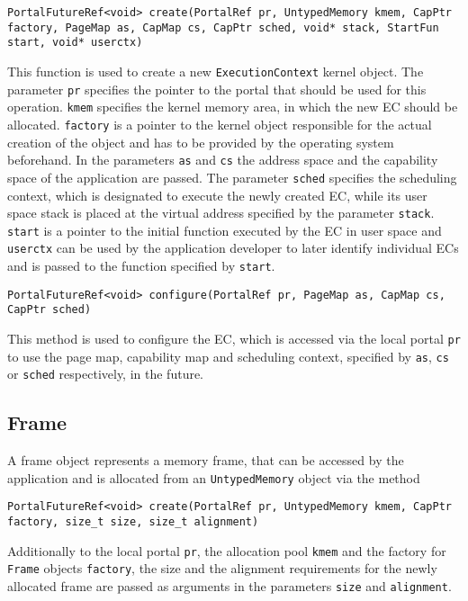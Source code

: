 \lstset{language=c++,numbers=none}
\begin{lstlisting}
PortalFutureRef<void> create(PortalRef pr, UntypedMemory kmem, CapPtr factory, PageMap as, CapMap cs, CapPtr sched, void* stack, StartFun start, void* userctx)
\end{lstlisting}
This function is used to create a new \texttt{ExecutionContext} kernel object.
The parameter \texttt{pr} specifies the pointer to the portal that should be
used for this operation. \texttt{kmem} specifies the kernel memory area, in
which the new EC should be allocated. \texttt{factory} is a pointer to the
kernel object responsible for the actual creation of the object and has to be
provided by the operating system beforehand. In the parameters \texttt{as} and
\texttt{cs} the address space and the capability space of the application are
passed. The parameter \texttt{sched} specifies the scheduling context, which is
designated to execute the newly created EC, while its user space stack is placed
at the virtual address specified by the parameter \texttt{stack}.
\texttt{start} is a pointer to the initial function executed by the EC in user
space and \texttt{userctx} can be used by the application developer to later
identify individual ECs and is passed to the function specified by
\texttt{start}.

\lstset{language=c++,numbers=none}
\begin{lstlisting}
PortalFutureRef<void> configure(PortalRef pr, PageMap as, CapMap cs, CapPtr sched)
\end{lstlisting}
This method is used to configure the EC, which is accessed via
the local portal \texttt{pr} to use the page map, capability map and
scheduling context, specified by \texttt{as}, \texttt{cs} or \texttt{sched}
respectively, in the future.

\subsection{Frame}
A frame object represents a memory frame, that can be accessed by the
application and is allocated from an \texttt{UntypedMemory} object via the
method
\lstset{language=c++,numbers=none}
\begin{lstlisting}
PortalFutureRef<void> create(PortalRef pr, UntypedMemory kmem, CapPtr factory, size_t size, size_t alignment)
\end{lstlisting}
\noindent Additionally to the local
portal \texttt{pr}, the allocation pool \texttt{kmem} and the factory for
\texttt{Frame} objects \texttt{factory}, the size and the alignment requirements
for the newly allocated frame are passed as arguments in the parameters
\texttt{size} and \texttt{alignment}.

